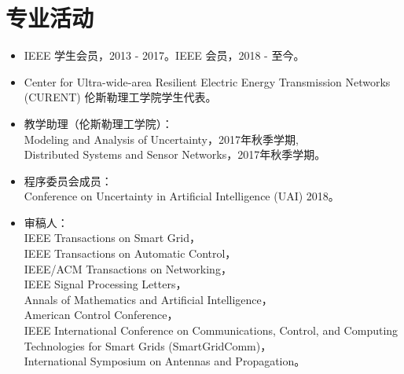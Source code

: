\documentclass{resume}
\begin{document}
\section{专业活动}
\begin{itemize}
	\item IEEE 学生会员，2013 - 2017。IEEE 会员，2018 - 至今。
	\item  Center for Ultra-wide-area Resilient Electric Energy Transmission Networks (CURENT) 伦斯勒理工学院学生代表。
	\item 教学助理（伦斯勒理工学院）：\\
	Modeling and Analysis of Uncertainty，2017年秋季学期, \\
	Distributed Systems and Sensor Networks，2017年秋季学期。
	\item 程序委员会成员：\\
	Conference on Uncertainty in Artificial Intelligence (UAI) 2018。
	\item 审稿人：\\
	IEEE Transactions on Smart Grid，\\
	IEEE Transactions on Automatic Control，\\
	IEEE/ACM Transactions on Networking，\\
	IEEE Signal Processing Letters，\\
	Annals of Mathematics and Artificial Intelligence，\\
	American Control Conference，\\
	IEEE International Conference on Communications, Control, and Computing Technologies
	for Smart Grids (SmartGridComm)，\\
	International Symposium on Antennas and Propagation。
\end{itemize}


%
%
\end{document}
